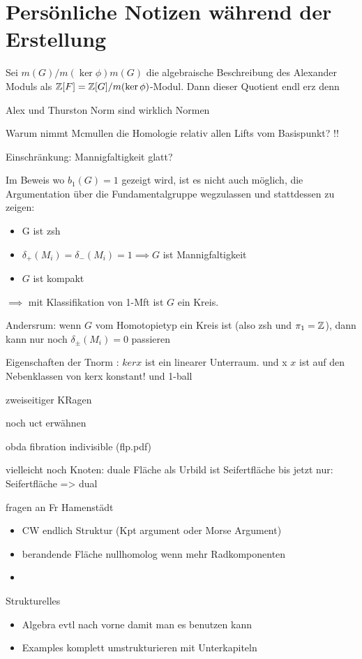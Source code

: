
\section{Persönliche Notizen während der Erstellung}
	Sei $m(G)/m(\ker \phi)m(G)$ die algebraische Beschreibung des Alexander Moduls als $\mathbb{Z}[F]=\mathbb{Z}[G]/m(\ker \phi)$-Modul. Dann dieser Quotient endl erz denn

	Alex und Thurston Norm sind wirklich Normen 

	Warum nimmt Mcmullen die Homologie relativ allen Lifts vom Basispunkt?  !!

	Einschränkung: Mannigfaltigkeit glatt?

	Im Beweis wo $b_1(G)=1$ gezeigt wird, ist es nicht auch möglich, die Argumentation über die Fundamentalgruppe wegzulassen und stattdessen zu zeigen:
	\begin{itemize}
		\item G ist zsh
		\item $\delta_+(M_i) = \delta_-(M_i)=1 \implies G$ ist Mannigfaltigkeit
		\item $G$ ist kompakt
	\end{itemize}
	$\implies$ mit Klassifikation von 1-Mft ist $G$ ein Kreis.

	Andersrum: wenn $G$ vom Homotopietyp ein Kreis ist (also zsh und $\pi_1=\mathbb{Z}$), dann kann nur noch $\delta_\pm(M_i)=0$ passieren

	Eigenschaften der Tnorm : $kerx$ ist ein linearer Unterraum. und x $x$ ist auf den Nebenklassen von kerx konstant! und 1-ball

	zweiseitiger KRagen

	noch uct erwähnen

	obda fibration indivisible (flp.pdf)


	vielleicht noch Knoten: duale Fläche als Urbild ist Seifertfläche
	bis jetzt nur: Seifertfläche => dual


	fragen an Fr Hamenstädt
	\begin{itemize}
		\item CW endlich Struktur (Kpt argument oder Morse Argument)
		\item  berandende Fläche nullhomolog wenn mehr Radkomponenten
		\item 
	\end{itemize}

	{Strukturelles}
	\begin{itemize}
		\item Algebra evtl nach vorne damit man es benutzen kann
		\item Examples komplett umstrukturieren mit Unterkapiteln
	\end{itemize}